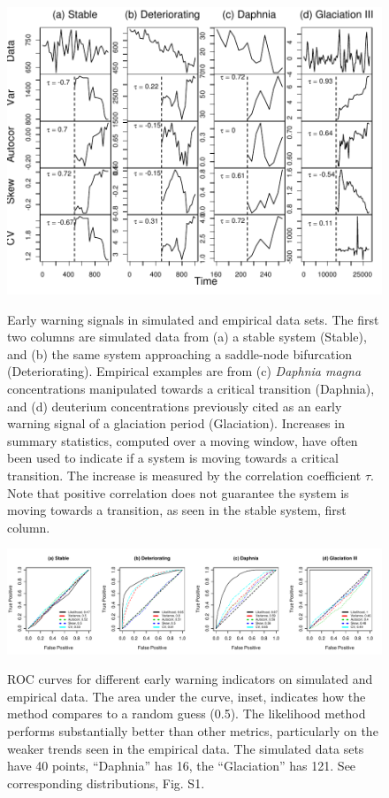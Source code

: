 \documentclass[authoryear,preprint,11pt]{elsarticle}
\begin{document}
 \begin{figure}[h]
   \begin{center}
     \includegraphics[width=\linewidth]{Fig2}
     \label{fig:fig2}
     \caption{Early warning signals in simulated and empirical data sets.  The first two columns are simulated data from (a) a stable system (Stable), and (b) the same system approaching a saddle-node bifurcation (Deteriorating).  Empirical examples are from (c) \emph{Daphnia magna} concentrations manipulated towards a critical transition (Daphnia), and (d) deuterium concentrations previously cited as an early warning signal of a glaciation period (Glaciation). Increases in summary statistics, computed over a moving window, have often been used to indicate if a system is moving towards a critical transition.  The increase is measured by the correlation coefficient $\tau$.  Note that positive correlation does not guarantee the system is moving towards a transition, as seen in the stable system, first column.}
  \end{center}
 \end{figure}



 \begin{figure}[h]
   \begin{center}
     \includegraphics[width=\linewidth]{Fig3.pdf}
     \label{fig3}
     \caption{ROC curves for different early warning indicators on simulated and empirical data.  The area under the curve, inset, indicates how the method compares to a random guess (0.5).  The likelihood method performs substantially better than other metrics, particularly on the weaker trends seen in the empirical data. The simulated data sets have 40 points, ``Daphnia'' has 16, the ``Glaciation'' has 121. See corresponding distributions, Fig. S1.}
  \end{center}
 \end{figure}
\end{document}
